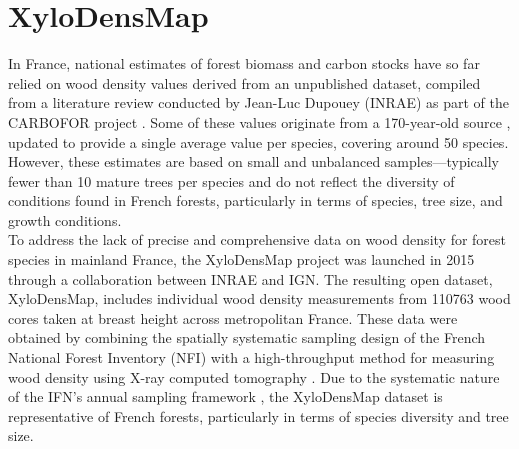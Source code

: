 \chapter{XyloDensMap \label{chap::xdm}}

In France, national estimates of forest biomass and carbon stocks have so far relied on wood density values derived from an unpublished dataset, compiled from a literature review conducted by Jean-Luc Dupouey (INRAE) as part of the CARBOFOR project \parencite{Loustau2004}. Some of these values originate from a 170-year-old source \parencite{Mathieu1855}, updated to provide a single average value per species, covering around 50 species. However, these estimates are based on small and unbalanced samples—typically fewer than 10 mature trees per species and do not reflect the diversity of conditions found in French forests, particularly in terms of species, tree size, and growth conditions. \\

To address the lack of precise and comprehensive data on wood density for forest species in mainland France, the Xylo\-Dens\-Map project was launched in 2015 through a collaboration between INRAE and IGN. The resulting open dataset, Xylo\-Dens\-Map, includes individual wood density measurements from \num{110763} wood cores taken at breast height across metropolitan France. These data were obtained by combining the spatially systematic sampling design of the French National Forest Inventory (NFI) with a high-throughput method for measuring wood density using X-ray computed tomography \parencite{Freyburger2009,Jacquin2019}. Due to the systematic nature of the IFN's annual sampling framework \parencite{Bontemps2024,Bouriaud2023}, the Xylo\-Dens\-Map dataset is representative of French forests, particularly in terms of species diversity and tree size. \\

